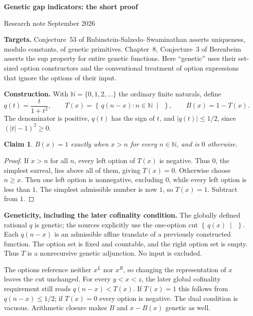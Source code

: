 \documentclass[11pt,letterpaper]{article}
\newcommand{\N}{\mathbb{N}}
\newcommand{\cut}[2]{\left\{\,#1\;\middle|\;#2\,\right\}}
\newtheorem*{claim}{Claim}
\begin{document}
\begin{center}
{\Large\bfseries Genetic gap indicators: the short proof}\par
\vspace{0.2cm}
{\small Research note \;\textbullet{} September 2026}
\end{center}
\noindent\textbf{Targets.} Conjecture~53 of Rubinstein-Salzedo--Swaminathan
\cite{RSS} asserts uniqueness, modulo constants, of genetic primitives.
Chapter~8, Conjecture~3 of Berenbeim \cite{B} asserts the sup property for
entire genetic functions. Here ``genetic'' uses their set-sized option
constructors and the conventional treatment of option expressions that
ignore the options of their input.

\noindent\textbf{Construction.} With $\N=\{0,1,2,\ldots\}$ the ordinary finite
naturals, define
\[
 q(t)=\frac{t}{1+t^2},\qquad
 T(x)=\cut{q(n-x):n\in\N}{},\qquad B(x)=1-T(x).
\]
The denominator is positive, $q(t)$ has the sign of $t$, and
$|q(t)|\le1/2$, since $(|t|-1)^2\ge0$.

\begin{claim}
$B(x)=1$ exactly when $x>n$ for every $n\in\N$, and is $0$ otherwise.
\end{claim}
\begin{proof}
If $x>n$ for all $n$, every left option of $T(x)$ is negative. Thus $0$,
the simplest surreal, lies above all of them, giving $T(x)=0$.
Otherwise choose $n\ge x$. Then one left option is nonnegative, excluding
$0$, while every left option is less than $1$. The simplest admissible
number is now $1$, so $T(x)=1$. Subtract from $1$.
\end{proof}

\noindent\textbf{Geneticity, including the later cofinality condition.}
The globally defined rational $q$ is genetic; the sources explicitly use
the one-option cut $\cut{q(x)}{}$. Each $q(n-x)$ is an admissible affine
translate of a previously constructed function. The option set is fixed
and countable, and the right option set is empty. Thus $T$ is a
nonrecursive genetic adjunction. No input is excluded.

The options reference neither $x^L$ nor $x^R$, so changing the representation
of $x$ leaves the cut unchanged. For every $y<x<z$, the later global
cofinality requirement still reads $q(n-x)<T(x)$. If $T(x)=1$ this follows
from $q(n-x)\le1/2$; if $T(x)=0$ every option is negative. The dual condition
is vacuous. Arithmetic closure makes $B$ and $x-B(x)$ genetic as well.
\end{document}
